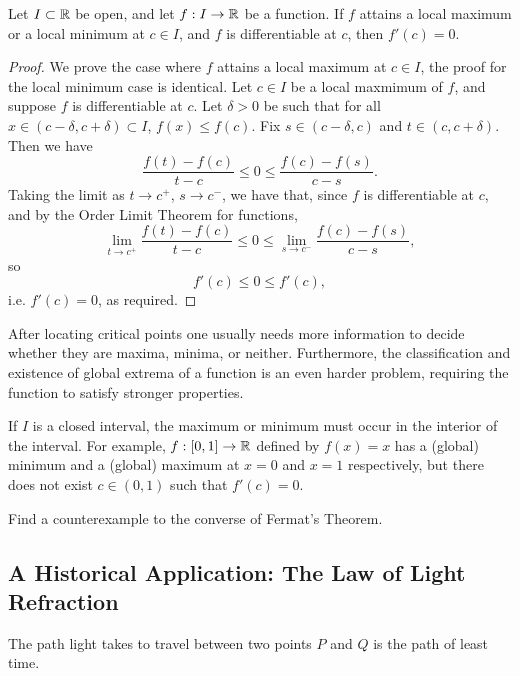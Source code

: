 \documentclass[../analysis1.tex]{subfiles}
\begin{document}
\begin{theorem}
\label{thm:fermat}
    \begin{shaded*}
        Let $I\subset\mathbb{R}$ be open, and let $f:I\to\mathbb{R}$ be a function. If $f$ attains a local maximum or a local minimum at $c\in I$, and $f$ is differentiable at $c$, then $f'(c)=0$.
    \end{shaded*}
\end{theorem}
\begin{proof}
    We prove the case where $f$ attains a local maximum at $c\in I$, the proof for the local minimum case is identical. Let $c\in I$ be a local maxmimum of $f$, and suppose $f$ is differentiable at $c$. Let $\delta>0$ be such that for all $x\in (c-\delta,c+\delta)\subset I$, $f(x)\le f(c)$. Fix $s\in(c-\delta,c)$ and $t\in(c,c+\delta)$. Then we have
    \[\frac{f(t)-f(c)}{t-c}\le 0\le \frac{f(c)-f(s)}{c-s}.\]
    Taking the limit as $t\to c^+$, $s\to c^-$, we have that, since $f$ is differentiable at $c$, and by the Order Limit Theorem for functions,
    \[\lim_{t\to c^+}\frac{f(t)-f(c)}{t-c}\le 0\le \lim_{s\to c^-}\frac{f(c)-f(s)}{c-s},\]
    so
    \[f'(c)\le 0\le f'(c),\]
    i.e. $f'(c)=0$, as required.\qedhere
\end{proof}

After locating critical points one usually needs more information to decide whether they are maxima, minima, or neither. Furthermore, the classification and existence of global extrema of a function is an even harder problem, requiring the function to satisfy stronger properties. 

\begin{remark}
    If $I$ is a closed interval, the maximum or minimum must occur in the interior of the interval. For example, $f:[0,1]\to\mathbb{R}$ defined by $f(x)=x$ has a (global) minimum and a (global) maximum at $x=0$ and $x=1$ respectively, but there does not exist $c\in(0,1)$ such that $f'(c)=0$.
\end{remark}

\begin{exercise*}
    Find a counterexample to the converse of Fermat's Theorem.
\end{exercise*}

\subsection{A Historical Application: The Law of Light Refraction}

\begin{theorem}
    \begin{shaded*}
        The path light takes to travel between two points $P$ and $Q$ is the path of least time.
    \end{shaded*}
\end{theorem}
\end{document}

